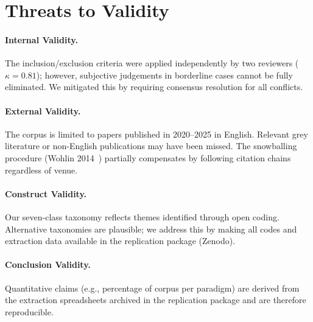 
\section{Threats to Validity}
\label{sec:threats}

\paragraph{Internal Validity.}
The inclusion/exclusion criteria were applied independently by two reviewers
($\kappa = 0.81$); however, subjective judgements in borderline cases cannot
be fully eliminated.  We mitigated this by requiring consensus resolution for
all conflicts.

\paragraph{External Validity.}
The corpus is limited to papers published in 2020–2025 in English.  Relevant
grey literature or non-English publications may have been missed.  The
snowballing procedure (Wohlin 2014~\cite{wohlin2014snowballing}) partially
compensates by following citation chains regardless of venue.

\paragraph{Construct Validity.}
Our seven-class taxonomy reflects themes identified through open coding.
Alternative taxonomies are plausible; we address this by making all codes
and extraction data available in the replication package (Zenodo).

\paragraph{Conclusion Validity.}
Quantitative claims (e.g., percentage of corpus per paradigm) are derived
from the extraction spreadsheets archived in the replication package and are
therefore reproducible.
